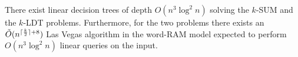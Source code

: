 \begin{contribution}[label=thm:cube,restate=TheoremKSUMCube]
There exist linear decision trees of depth \(O(n^3\log^2 n)\) solving
the \(k\)-SUM and the \(k\)-LDT problems. Furthermore, for the two problems there
exists an $\tilde{O}(n^{\lceil\frac{k}{2}\rceil+8})$ Las Vegas algorithm in
the word-RAM model expected to perform $O(n^3 \log^2 n)$ linear queries on the input.
\end{contribution}
